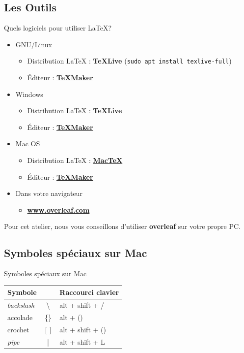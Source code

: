 \documentclass[10pt,svgnames,usenames,table]{beamer} %
\begin{document}
\subsection{Les Outils}
\begin{frame}{Quels logiciels pour utiliser \LaTeX{}?}

  \begin{itemize}
      \item GNU/Linux
      \begin{itemize}
          \item Distribution \LaTeX{} : \textbf{TeXLive}
          {\tiny (\lstinline|sudo apt install texlive-full|)}
        \item Éditeur : \textbf{\href{http://www.xm1math.net/texmaker/}{TeXMaker}}
      \end{itemize}
      \item Windows
      \begin{itemize}
        \item Distribution \LaTeX{} : \textbf{TeXLive}
        \item Éditeur : \textbf{\href{http://www.xm1math.net/texmaker/}{TeXMaker}}
      \end{itemize}
      \item Mac OS
      \begin{itemize}
        \item Distribution \LaTeX{} : \textbf{\href{https://www.tug.org/mactex/}{MacTeX}}
        \item Éditeur : \textbf{\href{http://www.xm1math.net/texmaker/}{TeXMaker}}
      \end{itemize}
      \item Dans votre navigateur
      \begin{itemize}
        \item \textbf{\url{www.overleaf.com}}
      \end{itemize}
  \end{itemize}
  Pour cet atelier, nous vous conseillons d'utiliser \textbf{overleaf} sur votre propre PC.
\end{frame}

\subsection{Symboles spéciaux sur Mac}
\begin{frame}{Symboles spéciaux sur Mac}
  \begin{center}
    \begin{tabular}{|lc|l|}
      \hline
      Symbole & & Raccourci clavier \\\hline
      \textit{backslash} & \textbackslash & alt + shift + / \\
      accolade & \{\} & alt + () \\
      crochet & $[]$ & alt + shift + () \\
      \textit{pipe} & | & alt + shift + L \\
      \hline
    \end{tabular}
  \end{center}
\end{frame}
\end{document}
